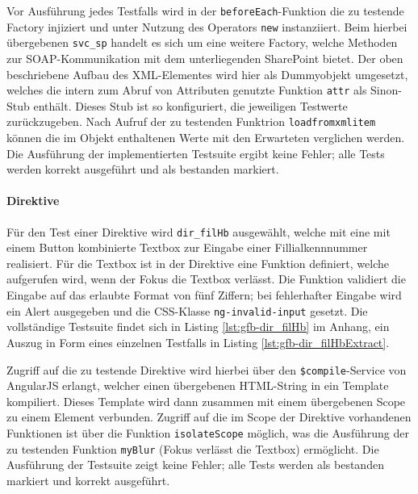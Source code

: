 \begin{figure}[H]
	
\end{figure}

Vor Ausführung jedes Testfalls wird in der \texttt{beforeEach}-Funktion die zu testende Factory injiziert und unter Nutzung des Operators \texttt{new} instanziiert. Beim hierbei übergebenen \texttt{svc\_sp} handelt es sich um eine weitere Factory, welche Methoden zur SOAP-Kommunikation mit dem unterliegenden SharePoint bietet. Der oben beschriebene Aufbau des XML-Elementes wird hier als Dummyobjekt umgesetzt, welches die intern zum Abruf von Attributen genutzte Funktion \texttt{attr} als Sinon-Stub enthält. Dieses Stub ist so konfiguriert, die jeweiligen Testwerte zurückzugeben. Nach Aufruf der zu testenden Funktrion \texttt{loadfromxmlitem} können die im Objekt enthaltenen Werte mit den Erwarteten verglichen werden. Die Ausführung der implementierten Testsuite ergibt keine Fehler; alle Tests werden korrekt ausgeführt und als bestanden markiert.

\paragraph{Direktive}
Für den Test einer Direktive wird \texttt{dir\_filHb} ausgewählt, welche mit eine mit einem Button kombinierte Textbox zur Eingabe einer Fillialkennnummer \todo{} realisiert. Für die Textbox ist in der Direktive eine Funktion definiert, welche aufgerufen wird, wenn der Fokus die Textbox verlässt. Die Funktion validiert die Eingabe auf das erlaubte Format von fünf Ziffern; bei fehlerhafter Eingabe wird ein Alert ausgegeben und die CSS-Klasse \texttt{ng-invalid-input} gesetzt. Die vollständige Testsuite findet sich in Listing \ref{lst:gfb-dir_filHb} im Anhang, ein Auszug in Form eines einzelnen Testfalls in Listing \ref{lst:gfb-dir_filHbExtract}.

\begin{figure}[H]
	
\end{figure}

Zugriff auf die zu testende Direktive wird hierbei über den \texttt{\$compile}-Service von AngularJS erlangt, welcher einen übergebenen HTML-String in ein Template kompiliert\cite{angular-compile}. Dieses Template wird dann zusammen mit einem übergebenen Scope zu einem Element verbunden. Zugriff auf die im Scope der Direktive vorhandenen Funktionen ist über die Funktion \texttt{isolateScope} möglich, was die Ausführung der zu testenden Funktion \texttt{myBlur} (Fokus verlässt die Textbox) ermöglicht. Die Ausführung der Testsuite zeigt keine Fehler; alle Tests werden als bestanden markiert und korrekt ausgeführt.

